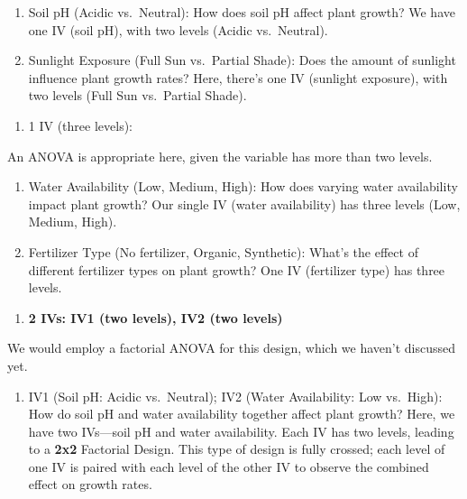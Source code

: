\documentclass[
  letterpaper,
  DIV=11,
  numbers=noendperiod]{scrreprt}
\providecommand{\tightlist}{%
  \setlength{\itemsep}{0pt}\setlength{\parskip}{0pt}}\usepackage{longtable,booktabs,array}
\begin{document}
\begin{enumerate}
\def\labelenumi{\alph{enumi}.}
\item
  Soil pH (Acidic vs.~Neutral): How does soil pH affect plant growth? We
  have one IV (soil pH), with two levels (Acidic vs.~Neutral).
\item
  Sunlight Exposure (Full Sun vs.~Partial Shade): Does the amount of
  sunlight influence plant growth rates? Here, there's one IV (sunlight
  exposure), with two levels (Full Sun vs.~Partial Shade).
\end{enumerate}

\begin{enumerate}
\def\labelenumi{\arabic{enumi}.}
\setcounter{enumi}{1}
\tightlist
\item
  1 IV (three levels):
\end{enumerate}

An ANOVA is appropriate here, given the variable has more than two
levels.

\begin{enumerate}
\def\labelenumi{\alph{enumi}.}
\item
  Water Availability (Low, Medium, High): How does varying water
  availability impact plant growth? Our single IV (water availability)
  has three levels (Low, Medium, High).
\item
  Fertilizer Type (No fertilizer, Organic, Synthetic): What's the effect
  of different fertilizer types on plant growth? One IV (fertilizer
  type) has three levels.
\end{enumerate}

\begin{enumerate}
\def\labelenumi{\arabic{enumi}.}
\setcounter{enumi}{2}
\tightlist
\item
  \textbf{2 IVs: IV1 (two levels), IV2 (two levels)}
\end{enumerate}

We would employ a factorial ANOVA for this design, which we haven't
discussed yet.

\begin{enumerate}
\def\labelenumi{\alph{enumi}.}
\tightlist
\item
  IV1 (Soil pH: Acidic vs.~Neutral); IV2 (Water Availability: Low
  vs.~High): How do soil pH and water availability together affect plant
  growth? Here, we have two IVs---soil pH and water availability. Each
  IV has two levels, leading to a \textbf{2x2} Factorial Design. This
  type of design is fully crossed; each level of one IV is paired with
  each level of the other IV to observe the combined effect on growth
  rates.
\end{enumerate}
\end{document}

